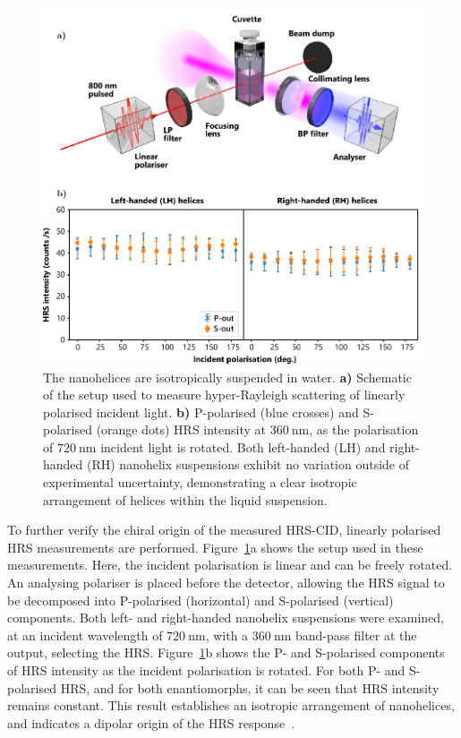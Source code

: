 \begin{figure}[htb!]	
    \centering	
    \includegraphics[scale=1]{./figures/results/HRS/hrs_linpol_data.pdf}
    \caption{\label{fig:results:HRS:hrs_linpol_data}
    The nanohelices are isotropically suspended in water. \textbf{a)} Schematic of the setup used to measure hyper-Rayleigh scattering of linearly polarised incident light. \textbf{b)} P-polarised (blue crosses) and S-polarised (orange dots) HRS intensity at $\SI{360}{\nano\m}$, as the polarisation of $\SI{720}{\nano\m}$ incident light is rotated. Both left-handed (LH) and right-handed (RH) nanohelix suspensions exhibit no variation outside of experimental uncertainty, demonstrating a clear isotropic arrangement of helices within the liquid suspension.}	
\end{figure}

To further verify the chiral origin of the measured HRS-CID, linearly polarised HRS measurements are performed. Figure~\ref{fig:results:HRS:hrs_linpol_data}a shows the setup used in these measurements. Here, the incident polarisation is linear and can be freely rotated. An analysing polariser is placed before the detector, allowing the HRS signal to be decomposed into P-polarised (horizontal) and S-polarised (vertical) components. Both left- and right-handed nanohelix suspensions were examined, at an incident wavelength of $\SI{720}{\nano\m}$, with a $\SI{360}{\nano\m}$ band-pass filter at the output, selecting the HRS. 
Figure~\ref{fig:results:HRS:hrs_linpol_data}b shows the P- and S-polarised components of HRS intensity as the incident polarisation is rotated. For both P- and S-polarised HRS, and for both enantiomorphs, it can be seen that HRS intensity remains constant. This result establishes an isotropic arrangement of nanohelices, and indicates a dipolar origin of the HRS response~\cite{Hao2002b, verbiest2009second}. 

